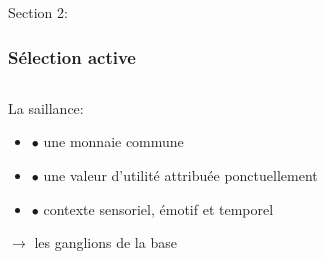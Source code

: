 \documentclass[10pt]{beamer}
\begin{document}
\begin{frame}{Section 2:}
\begin{center}
\end{center}

\end{frame}
\begin{frame}
  \frametitle{S\'election active}
\begin{columns}
    \begin{column}{0.5\textwidth}

\hspace*{0.4\textwidth}
\end{column}
    \begin{column}{0.5\textwidth}
\hspace*{0.3\textwidth}
\end{column}
\end{columns}

 La {\color {blue} saillance}: 
\begin {itemize}
\item[$\bullet$] une monnaie commune
\item[$\bullet$] une valeur d'utilit\'e attribu\'ee ponctuellement
\item[$\bullet$] contexte sensoriel, \'emotif et temporel
\end {itemize}
 \hspace{2cm}\vspace{2cm}$\to$ les ganglions de la base
\end{frame}
\end{document}
